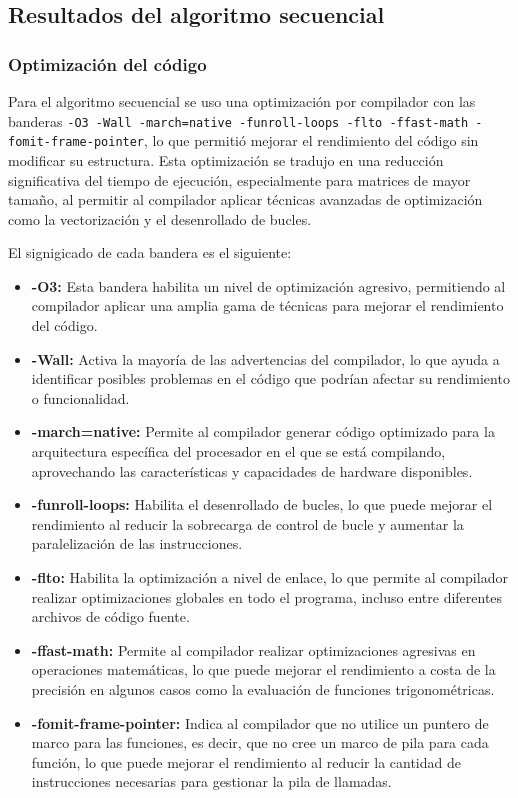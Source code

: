 \subsection{Resultados del algoritmo secuencial}


\subsubsection{Optimización del código}

Para el algoritmo secuencial se uso una optimización por compilador con las banderas \texttt{-O3 -Wall -march=native -funroll-loops -flto -ffast-math -fomit-frame-pointer}, lo que permitió mejorar el rendimiento del código sin modificar su estructura. Esta optimización se tradujo en una reducción significativa del tiempo de ejecución, especialmente para matrices de mayor tamaño, al permitir al compilador aplicar técnicas avanzadas de optimización como la vectorización y el desenrollado de bucles.

El signigicado de cada bandera es el siguiente:
\begin{itemize}
   \item \textbf{-O3:} Esta bandera habilita un nivel de optimización agresivo, permitiendo al compilador aplicar una amplia gama de técnicas para mejorar el rendimiento del código.
   \item \textbf{-Wall:} Activa la mayoría de las advertencias del compilador, lo que ayuda a identificar posibles problemas en el código que podrían afectar su rendimiento o funcionalidad.
   \item \textbf{-march=native:} Permite al compilador generar código optimizado para la arquitectura específica del procesador en el que se está compilando, aprovechando las características y capacidades de hardware disponibles.
   \item \textbf{-funroll-loops:} Habilita el desenrollado de bucles, lo que puede mejorar el rendimiento al reducir la sobrecarga de control de bucle y aumentar la paralelización de las instrucciones.
   \item \textbf{-flto:} Habilita la optimización a nivel de enlace, lo que permite al compilador realizar optimizaciones globales en todo el programa, incluso entre diferentes archivos de código fuente.
   \item \textbf{-ffast-math:} Permite al compilador realizar optimizaciones agresivas en operaciones matemáticas, lo que puede mejorar el rendimiento a costa de la precisión en algunos casos como la evaluación de funciones trigonométricas.
   \item \textbf{-fomit-frame-pointer:} Indica al compilador que no utilice un puntero de marco para las funciones, es decir, que no cree un marco de pila para cada función, lo que puede mejorar el rendimiento al reducir la cantidad de instrucciones necesarias para gestionar la pila de llamadas.
\end{itemize}

